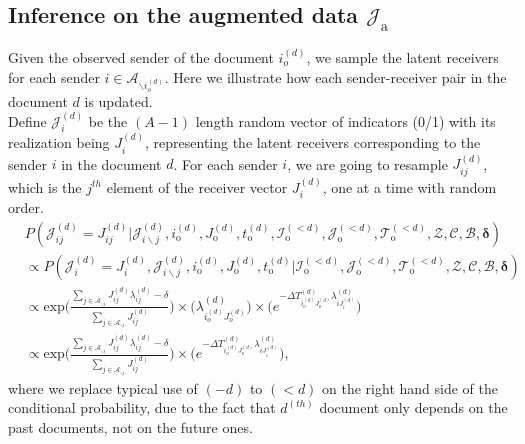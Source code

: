 \documentclass[a4paper]{article}
\begin{document}
  \subsection{Inference on the augmented data $\mathcal{J}_{\mbox{a}}$}
     Given the observed sender of the document $i_o^{(d)}$, we sample the latent receivers for each sender $i \in \mathcal{A}_{\backslash i_o^{(d)}}$. Here we illustrate how each sender-receiver pair in the document $d$ is updated.\\\newline
       Define ${\mathcal{J}}^{(d)}_{i}$ be the $(A-1)$ length random vector of indicators (0/1) with its realization being $J^{(d)}_{i}$, representing the latent receivers corresponding to the sender $i$ in the document $d$. For each sender $i$, we are going to resample ${J}^{(d)}_{ij}$, which is the $j^{th}$ element of the receiver vector ${J}^{(d)}_{i}$, one at a time with random order. \\
       \begin{equation}
       \begin{aligned}
       &P(\mathcal{J}^{(d)}_{ij} = {J}^{(d)}_{ij}|\mathcal{J}^{(d)}_{i\backslash j}, i^{(d)}_{\mbox{o}}, J^{(d)}_{\mbox{o}}, t^{(d)}_{\mbox{o}}, \mathcal{I}^{(<d)}_{\mbox{o}}, \mathcal{J}^{(<d)}_{\mbox{o}}, \mathcal{T}^{(<d)}_{\mbox{o}}, \mathcal{Z}, \mathcal{C}, \mathcal{B}, \boldsymbol{\delta})\\&\propto P(\mathcal{J}^{(d)}_{i} ={J}^{(d)}_{i}, \mathcal{J}^{(d)}_{i\backslash j}, i^{(d)}_{\mbox{o}}, J^{(d)}_{\mbox{o}}, t^{(d)}_{\mbox{o}}| \mathcal{I}^{(<d)}_{\mbox{o}}, \mathcal{J}^{(<d)}_{\mbox{o}}, \mathcal{T}^{(<d)}_{\mbox{o}}, \mathcal{Z}, \mathcal{C}, \mathcal{B}, \boldsymbol{\delta})
       \\&\propto \mbox{exp}\Big(\frac{\sum_{j \in \mathcal{A}_{\backslash i}}J^{(d)}_{ij}\lambda^{(d)}_{ij} - \delta}{\sum\limits_{j \in \mathcal{A}_{\backslash i}}J^{(d)}_{ij}}\Big)\times \Big(\lambda^{(d)}_{i_o^{(d)}J_{o}^{(d)}}\Big)\times  \Big(e^{-\Delta T^{(d)}_{i_o^{(d)}J_o^{(d)}}\lambda^{(d)}_{iJ^{(d)}_{i}}}\Big)
       \\& \propto \mbox{exp}\Big(\frac{\sum_{j \in \mathcal{A}_{\backslash i}}J^{(d)}_{ij}\lambda^{(d)}_{ij} - \delta}{\sum\limits_{j \in \mathcal{A}_{\backslash i}}J^{(d)}_{ij}}\Big)\times \Big(e^{-\Delta T^{(d)}_{i_o^{(d)}J_o^{(d)}}\lambda^{(d)}_{iJ^{(d)}_{i}}}\Big),
       \end{aligned}
       \end{equation}
       where we replace typical use of $(-d)$ to $(<d)$ on the right hand side of the conditional probability, due to the fact that $d^{(th)}$ document only depends on the past documents, not on the future ones.\\ \newline
\end{document}
